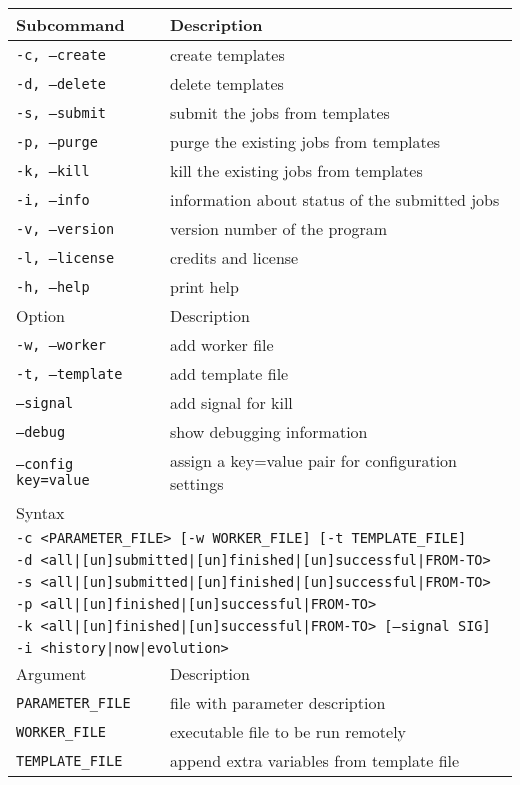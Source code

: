 \documentclass[12pt,a4paper]{article}
\begin{document}
\begin{itemize}
{\begin{table}[!th]
\center
\begin{tabular}{ll}
\hline
Subcommand & Description\\
\hline
{\tt -c, --create} & create templates\\
{\tt -d, --delete} & delete templates\\
{\tt -s, --submit} & submit the jobs from templates\\
{\tt -p, --purge} & purge the existing jobs from templates\\
{\tt -k, --kill} & kill the existing jobs from templates\\
{\tt -i, --info} & information about status of the submitted jobs\\
{\tt -v, --version} & version number of the program\\
{\tt -l, --license} & credits and license\\
{\tt -h, --help} & print help\\
\hline
Option & Description\\
\hline
{\tt -w, --worker} & add worker file\\
{\tt -t, --template} & add template file\\
{\tt     --signal} & add signal for kill\\
{\tt     --debug} & show debugging information\\
{\tt     --config key=value}& assign a key=value pair for configuration settings\\
\hline
Syntax\\
\hline
\multicolumn{2}{l}{{\tt -c <PARAMETER\_FILE> [-w WORKER\_FILE] [-t TEMPLATE\_FILE]}}\\
\multicolumn{2}{l}{\tt -d <all|[un]submitted|[un]finished|[un]successful|FROM-TO>}\\
\multicolumn{2}{l}{\tt -s <all|[un]submitted|[un]finished|[un]successful|FROM-TO>}\\
\multicolumn{2}{l}{\tt -p <all|[un]finished|[un]successful|FROM-TO>}\\
\multicolumn{2}{l}{\tt -k <all|[un]finished|[un]successful|FROM-TO> [--signal SIG]}\\
\multicolumn{2}{l}{\tt -i <history|now|evolution>}\\
\hline
Argument & Description\\
\hline
{\tt PARAMETER\_FILE} & file with parameter description\\
{\tt WORKER\_FILE} & executable file to be run remotely\\
{\tt TEMPLATE\_FILE} & append extra variables from template file\\

\end{tabular}
\end{table}}
\end{itemize}
\end{document}

